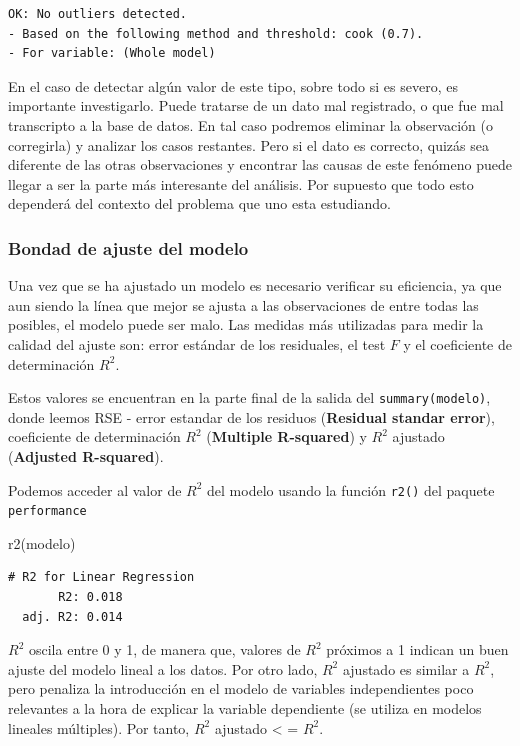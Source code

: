 \documentclass[
  letterpaper,
  DIV=11,
  numbers=noendperiod]{scrartcl}
\newenvironment{Shaded}{\begin{snugshade}}{\end{snugshade}}
\newcommand{\FunctionTok}[1]{\textcolor[rgb]{0.28,0.35,0.67}{#1}}
\newcommand{\NormalTok}[1]{\textcolor[rgb]{0.00,0.23,0.31}{#1}}
\begin{document}
\begin{verbatim}
OK: No outliers detected.
- Based on the following method and threshold: cook (0.7).
- For variable: (Whole model)
\end{verbatim}

En el caso de detectar algún valor de este tipo, sobre todo si es
severo, es importante investigarlo. Puede tratarse de un dato mal
registrado, o que fue mal transcripto a la base de datos. En tal caso
podremos eliminar la observación (o corregirla) y analizar los casos
restantes. Pero si el dato es correcto, quizás sea diferente de las
otras observaciones y encontrar las causas de este fenómeno puede llegar
a ser la parte más interesante del análisis. Por supuesto que todo esto
dependerá del contexto del problema que uno esta estudiando.

\subsubsection{Bondad de ajuste del
modelo}\label{bondad-de-ajuste-del-modelo}

Una vez que se ha ajustado un modelo es necesario verificar su
eficiencia, ya que aun siendo la línea que mejor se ajusta a las
observaciones de entre todas las posibles, el modelo puede ser malo. Las
medidas más utilizadas para medir la calidad del ajuste son: error
estándar de los residuales, el test \(F\) y el coeficiente de
determinación \(R^2\).

Estos valores se encuentran en la parte final de la salida del
\texttt{summary(modelo)}, donde leemos RSE - error estandar de los
residuos (\textbf{Residual standar error}), coeficiente de determinación
\(R^2\) (\textbf{Multiple R-squared}) y \(R^2\) ajustado
(\textbf{Adjusted R-squared}).

Podemos acceder al valor de \(R^2\) del modelo usando la función
\texttt{r2()} del paquete \texttt{performance}

\begin{Shaded}
\begin{Highlighting}[]
\FunctionTok{r2}\NormalTok{(modelo)}
\end{Highlighting}
\end{Shaded}

\begin{verbatim}
# R2 for Linear Regression
       R2: 0.018
  adj. R2: 0.014
\end{verbatim}

\(R^2\) oscila entre 0 y 1, de manera que, valores de \(R^2\) próximos a
1 indican un buen ajuste del modelo lineal a los datos. Por otro lado,
\(R^2\) ajustado es similar a \(R^2\), pero penaliza la introducción en
el modelo de variables independientes poco relevantes a la hora de
explicar la variable dependiente (se utiliza en modelos lineales
múltiples). Por tanto, \(R^2\) ajustado \textless{} = \(R^2\).
\end{document}
